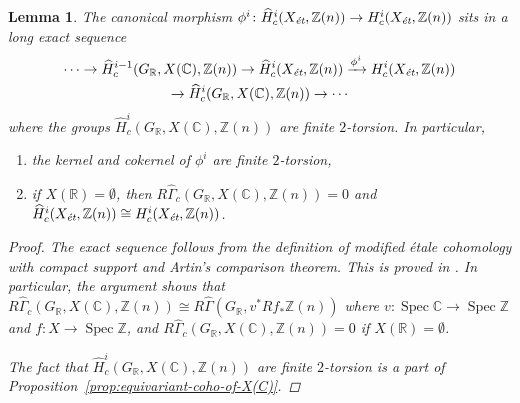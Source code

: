 \documentclass[leqno,12pt]{article}
\theoremstyle{plain}
\newtheorem{lemma}[theorem]{\indent\sc Lemma}
\theoremstyle{definition}
\DeclareMathOperator{\Spec}{Spec}
\newcommand{\CC}{\mathbb{C}}
\newcommand{\RR}{\mathbb{R}}
\newcommand{\ZZ}{\mathbb{Z}}
\newcommand{\et}{\text{\it \'{e}t}}
\begin{document}
\begin{lemma}
  \label{lemma:morphism-hat-Hc(Xet,Z(n))->Hc(Xet,Z(n))}
  The canonical morphism
  $\phi^i\colon \widehat{H}^i_c (X_\et, \ZZ (n)) \to H^i_c (X_\et, \ZZ (n))$
  sits in a long exact sequence
  \begin{multline*}
    \cdots \to \widehat{H}^{i-1}_c (G_\RR, X (\CC), \ZZ (n)) \to
    \widehat{H}_c^i (X_\et, \ZZ(n)) \xrightarrow{\phi^i}
    H_c^i (X_\et, \ZZ(n)) \\
    \to \widehat{H}^i_c (G_\RR, X (\CC), \ZZ (n)) \to \cdots
  \end{multline*}
  where the groups $\widehat{H}^i_c (G_\RR, X (\CC), \ZZ (n))$ are finite
  $2$-torsion. In particular,
  \begin{enumerate}
  \item[$1)$] the kernel and cokernel of $\phi^i$ are finite $2$-torsion,

  \item[$2)$] if $X (\RR) = \emptyset$, then
    $R\widehat{\Gamma}_c (G_\RR, X (\CC), \ZZ (n)) = 0$ and
    $\widehat{H}^i_c (X_\et, \ZZ (n)) \cong H^i_c (X_\et, \ZZ (n))$.
  \end{enumerate}

  \begin{proof}
    The exact sequence follows from the definition of modified \'{e}tale cohomology
    with compact support and Artin's comparison theorem. This is proved in
    \cite[Lemma~6.14]{Flach-Morin-2018}. In particular, the argument shows that
    $R\widehat{\Gamma}_c (G_\RR, X (\CC), \ZZ (n)) \cong
    R\widehat{\Gamma} (G_\RR, v^* Rf_* \ZZ(n))$ where
    $v\colon \Spec \CC \to \Spec \ZZ$ and $f\colon X\to \Spec \ZZ$,
    and $R\widehat{\Gamma}_c (G_\RR, X (\CC), \ZZ (n)) = 0$ if
    $X (\RR) = \emptyset$.

    The fact that $\widehat{H}^i_c (G_\RR, X (\CC), \ZZ (n))$ are finite
    $2$-torsion is a part of Proposition~\ref{prop:equivariant-coho-of-X(C)}.
  \end{proof}
\end{lemma}
\end{document}
